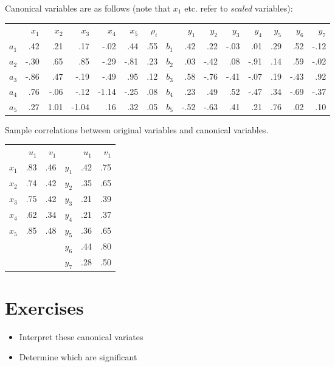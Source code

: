 \documentclass[11pt]{article}
\begin{document}
Canonical variables are as follows (note that $x_{1}$ etc. refer to \emph{scaled} variables):


\begin{tabular}{lrrrrr|r|lrrrrrrr}
\scriptsize
 & $x_{1}$ & $x_{2}$ & $x_{3}$ & $x_{4}$ & $x_{5}$ & $\rho_{i}$ & & $y_{1}$ & $y_{2}$ & $y_{3}$ & $y_{4}$ & $y_{5}$ & $y_{6}$ & $y_{7}$\\
$a_{1}$ & .42 & .21 & .17 & -.02 & .44 & .55 &  $b_{1}$ & .42 & .22 & -.03 & .01 & .29 & .52 & -.12\\
$a_{2}$ & -.30 & .65 & .85 & -.29 & -.81 & .23 & $b_{2}$ & .03 & -.42 & .08 & -.91 & .14 & .59 & -.02\\
$a_{3}$ & -.86 & .47 & -.19 & -.49 & .95 & .12 & $b_{3}$ & .58 & -.76 & -.41 & -.07 & .19 & -.43 & .92\\
$a_{4}$ & .76 & -.06 & -.12 & -1.14 & -.25 & .08 & $b_{4}$ & .23 & .49 & .52 & -.47 & .34 & -.69 & -.37\\
$a_{5}$ & .27 & 1.01 & -1.04 & .16 & .32 & .05 & $b_{5}$ & -.52 & -.63 & .41 & .21 & .76 & .02 & .10 
\end{tabular}


Sample correlations between original variables and canonical variables.

\begin{tabular}{lrr|lrr}
 & $u_{1}$ & $v_{1}$ & & $u_{1}$ & $v_{1}$\\
$x_{1}$ & .83 & .46 & $y_{1}$ & .42 & .75\\
$x_{2}$ & .74 & .42 & $y_{2}$ & .35 & .65\\
$x_{3}$ & .75 & .42 & $y_{3}$ & .21 & .39\\
$x_{4}$ & .62 & .34 & $y_{4}$ & .21 & .37\\
$x_{5}$ & .85 & .48 & $y_{5}$ & .36 & .65\\
 & & & $y_{6}$ & .44 & .80\\
 & & & $y_{7}$ & .28 & .50
 \end{tabular}


\section{Exercises}

\begin{itemize}
\item Interpret these canonical variates
\item Determine which are significant
\end{itemize}
\end{document}
